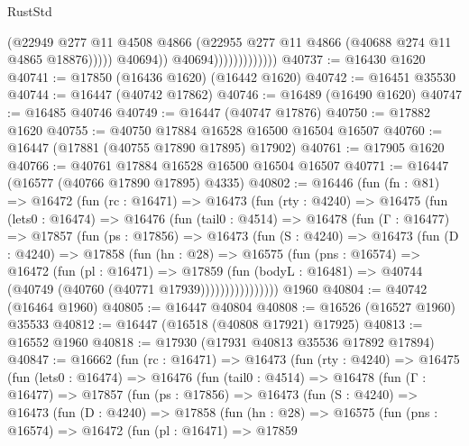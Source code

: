 \begin{lexlean}{RustStd}
\begin{coremodule}
                                      (@22949
                                        @277
                                        @11
                                        @4508
                                        @4866
                                        (@22955 @277 @11 @4866 (@40688 @274 @11 @4865 @18876)))))
                                  @40694))
                              @40694)))))))))))))
@40737 := @16430 @1620
@40741 := @17850 (@16436 @1620) (@16442 @1620)
@40742 := @16451 @35530
@40744 := @16447 (@40742 @17862)
@40746 := @16489 (@16490 @1620)
@40747 := @16485 @40746
@40749 := @16447 (@40747 @17876)
@40750 := @17882 @1620
@40755 := @40750 @17884 @16528 @16500 @16504 @16507
@40760 := @16447 (@17881 (@40755 @17890 @17895) @17902)
@40761 := @17905 @1620
@40766 := @40761 @17884 @16528 @16500 @16504 @16507
@40771 := @16447 (@16577 (@40766 @17890 @17895) @4335)
@40802 := @16446
    (fun (fn : @81) =>
    @16472
      (fun (rc : @16471) =>
      @16473
        (fun (rty : @4240) =>
        @16475
          (fun (lets0 : @16474) =>
          @16476
            (fun (tail0 : @4514) =>
            @16478
              (fun (Γ : @16477) =>
              @17857
                (fun (ps : @17856) =>
                @16473
                  (fun (S : @4240) =>
                  @16473
                    (fun (D : @4240) =>
                    @17858
                      (fun (hn : @28) =>
                      @16575
                        (fun (pns : @16574) =>
                        @16472
                          (fun (pl : @16471) =>
                          @17859
                            (fun (bodyL : @16481) =>
                            @40744 (@40749 (@40760 (@40771 @17939))))))))))))))))
    @1960
@40804 := @40742 (@16464 @1960)
@40805 := @16447 @40804
@40808 := @16526 (@16527 @1960) @35533
@40812 := @16447 (@16518 (@40808 @17921) @17925)
@40813 := @16552 @1960
@40818 := @17930 (@17931 @40813 @35536 @17892 @17894)
@40847 := @16662
    (fun (rc : @16471) =>
    @16473
      (fun (rty : @4240) =>
      @16475
        (fun (lets0 : @16474) =>
        @16476
          (fun (tail0 : @4514) =>
          @16478
            (fun (Γ : @16477) =>
            @17857
              (fun (ps : @17856) =>
              @16473
                (fun (S : @4240) =>
                @16473
                  (fun (D : @4240) =>
                  @17858
                    (fun (hn : @28) =>
                    @16575
                      (fun (pns : @16574) =>
                      @16472
                        (fun (pl : @16471) =>
                        @17859

\end{coremodule}
\end{lexlean}
